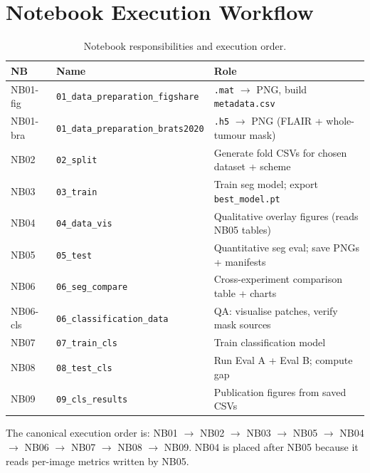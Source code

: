 \documentclass[12pt,a4paper]{article}
\begin{document}
\section{Notebook Execution Workflow}

\begin{table}[h]
  \centering
  \caption{Notebook responsibilities and execution order.}
  \label{tab:notebooks}
  \begin{tabular}{L{1.5cm} L{4.5cm} L{8cm}}
    \toprule
    \textbf{NB} & \textbf{Name} & \textbf{Role} \\
    \midrule
    NB01-fig & \texttt{01\_data\_preparation\_figshare} & \texttt{.mat} $\to$ PNG, build \texttt{metadata.csv} \\
    NB01-bra & \texttt{01\_data\_preparation\_brats2020} & \texttt{.h5} $\to$ PNG (FLAIR + whole-tumour mask) \\
    NB02     & \texttt{02\_split}                        & Generate fold CSVs for chosen dataset + scheme \\
    \midrule
    NB03     & \texttt{03\_train}                        & Train seg model; export \texttt{best\_model.pt} \\
    NB04     & \texttt{04\_data\_vis}                    & Qualitative overlay figures (reads NB05 tables) \\
    NB05     & \texttt{05\_test}                         & Quantitative seg eval; save PNGs + manifests \\
    NB06     & \texttt{06\_seg\_compare}                 & Cross-experiment comparison table + charts \\
    \midrule
    NB06-cls & \texttt{06\_classification\_data}         & QA: visualise patches, verify mask sources \\
    NB07     & \texttt{07\_train\_cls}                   & Train classification model \\
    NB08     & \texttt{08\_test\_cls}                    & Run Eval A + Eval B; compute gap \\
    NB09     & \texttt{09\_cls\_results}                 & Publication figures from saved CSVs \\
    \bottomrule
  \end{tabular}
\end{table}

The canonical execution order is:
NB01 $\to$ NB02 $\to$ NB03 $\to$ NB05 $\to$ NB04 $\to$ NB06
$\to$ NB07 $\to$ NB08 $\to$ NB09.
NB04 is placed after NB05 because it reads per-image metrics written by NB05.
\end{document}

